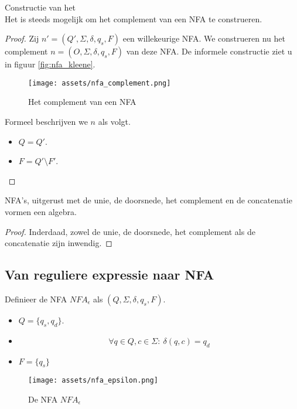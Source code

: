 \documentclass[main.tex]{subfiles}
\begin{document}
\begin{st}
  \label{st:complement-nfa}
  Constructie van het \\
  Het is steeds mogelijk om het complement van een NFA te construeren.

  \begin{proof}
    Zij $n' = (Q',\Sigma,\delta,q_{s},F)$ een willekeurige NFA. We construeren nu het complement $n = (O,\Sigma,\delta,q_{s},F)$ van deze NFA.
    De informele constructie ziet u in figuur \ref{fig:nfa_kleene}.
    \begin{figure}[H]
      \centering
      \texttt{[image: assets/nfa\_complement.png]}      
      \caption{Het complement van een NFA}
      \label{fig:nfa_complement}
    \end{figure}
    Formeel beschrijven we $n$ als volgt.
    \begin{itemize}
    \item $Q = Q'$.
    \item $F = Q'\setminus F'$.
    \end{itemize}
  \end{proof}
\end{st}

\begin{ei}
  NFA's, uitgerust met de unie, de doorsnede, het complement en de concatenatie vormen een algebra.
  \begin{proof}
    Inderdaad, zowel de unie, de doorsnede, het complement als de concatenatie zijn inwendig.
  \end{proof}
\end{ei}

\subsection{Van reguliere expressie naar NFA}
\label{sec:van-reguliere-expressie-naar-nfa}

\begin{de}
  Definieer de NFA $NFA_{\epsilon}$ als $(Q, \Sigma, \delta, q_{s}, F)$.

  \begin{itemize}
  \item $Q = \{q_{s},q_{d}\}$.
  \item 
    \[ \forall q \in Q, c \in \Sigma:\ \delta(q,c) = q_{d} \]
  \item $F = \{q_{s}\}$
  \end{itemize}

  \begin{figure}[H]
    \centering
    \texttt{[image: assets/nfa\_epsilon.png]}      
    \caption{De NFA $NFA_{\epsilon}$}
    \label{fig:nfa_epsilon}
  \end{figure}
\end{de}
\end{document}
